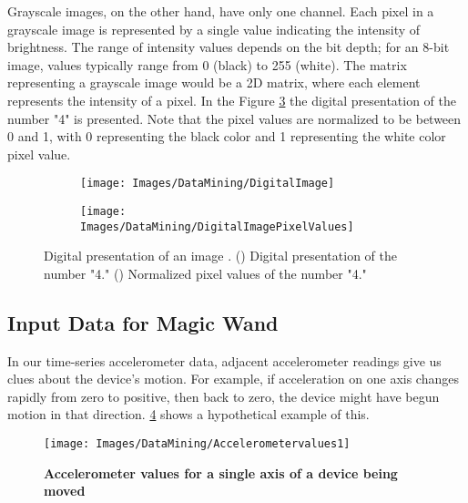 Grayscale images, on the other hand, have only one channel. Each pixel in a grayscale image is represented by a single value indicating the intensity of brightness. The range of intensity values depends on the bit depth; for an 8-bit image, values typically range from 0 (black) to 255 (white). The matrix representing a grayscale image would be a 2D matrix, where each element represents the intensity of a pixel. In the Figure \ref{fig:DigitalImage} the digital presentation of the number "4" is presented. Note that the pixel values are normalized to be between 0 and 1, with 0 representing the black color and 1 representing the white color pixel value. 


\begin{figure}[h!]
	\centering
	
	\begin{subfigure}{0.45\textwidth}
		\texttt{[image: Images/DataMining/DigitalImage]}
		\caption{}    %
		\label{subfig:DigitalImage}
	\end{subfigure}
	\hfill
	\begin{subfigure}{0.45\textwidth}
		\texttt{[image: Images/DataMining/DigitalImagePixelValues]}
		\caption{}    %
		\label{subfig:DigitalImagePixelValues}
	\end{subfigure}
	
	\caption{Digital presentation of an image \cite{Sewak:2018}. () Digital presentation of the number "4." () Normalized pixel values of the number "4."}
	\label{fig:DigitalImage}
\end{figure}

\subsection{Input Data for Magic Wand}
\label{subsection:InputDataMagicWand}

In our time-series accelerometer data, adjacent accelerometer readings give us clues about the device’s motion. For example, if acceleration on one axis changes rapidly from zero to positive, then back to zero, the device might have begun motion in that direction. \ref{Fig:5.7} shows a hypothetical example of this.

\begin{figure}[h!]
	
	\centering
	\texttt{[image: Images/DataMining/Accelerometervalues1]}
	\caption{\textbf{Accelerometer values for a single axis of a device being moved} \cite{War:2020}}
	\label{Fig:5.7}
\end{figure}

